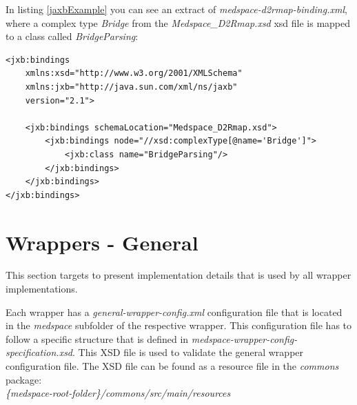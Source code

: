 In listing \ref{jaxbExample} you can see an extract of \emph{medspace-d2rmap-binding.xml}, where a complex type \emph{Bridge} from the \emph{Medspace\_D2Rmap.xsd} xsd file is mapped to a class called \emph{BridgeParsing}:

\begin{lstlisting}[style=RdfCodeStyle, caption=JAXB binding example, label=jaxbExample]
<jxb:bindings 
    xmlns:xsd="http://www.w3.org/2001/XMLSchema"
    xmlns:jxb="http://java.sun.com/xml/ns/jaxb"
    version="2.1">

    <jxb:bindings schemaLocation="Medspace_D2Rmap.xsd">
		<jxb:bindings node="//xsd:complexType[@name='Bridge']">
			<jxb:class name="BridgeParsing"/>
		</jxb:bindings>
    </jxb:bindings>
</jxb:bindings>
\end{lstlisting}

\section{Wrappers - General}

This section targets to present implementation details that is used by all wrapper implementations.

Each wrapper has a \emph{general-wrapper-config.xml} configuration file that is located in the \emph{medspace} subfolder of the respective wrapper. This configuration file has to follow a specific structure that is defined in \emph{medspace-wrapper-config-specification.xsd}. This XSD file is used to validate the general wrapper configuration file. The XSD file can be found as a resource file in the \emph{commons} package: \\
\emph{\{medspace-root-folder\}/commons/src/main/resources}


